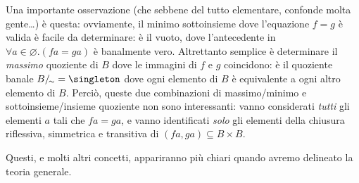 \begin{remark}
	Una importante osservazione (che sebbene del tutto elementare, confonde molta gente\dots) è questa: ovviamente, il minimo sottoinsieme dove l'equazione \(f=g\) è valida è facile da determinare: è il vuoto, dove l'antecedente in \(\forall a\in\varnothing.(fa=ga)\) è banalmente vero. Altrettanto semplice è determinare il \emph{massimo} quoziente di \(B\) dove le immagini di \(f\) e \(g\) coincidono: è il quoziente banale \(B/_{\!\sim} = \singleton\) dove ogni elemento di \(B\) è equivalente a ogni altro elemento di \(B\). Perciò, queste due combinazioni di massimo/minimo e sottoinsieme/insieme quoziente non sono interessanti: vanno considerati \emph{tutti} gli elementi \(a\) tali che \(fa=ga\), e vanno identificati \emph{solo} gli elementi della chiusura riflessiva, simmetrica e transitiva di \((fa,ga)\subseteq B\times B\).
\end{remark}
\Todo{}
Questi, e molti altri concetti, appariranno più chiari quando avremo delineato la teoria generale.
\Todo{}
